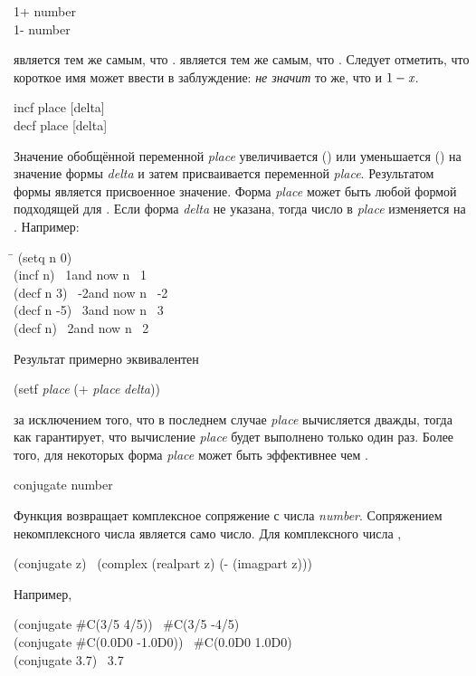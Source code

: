 \begin{defun}[Функция]
1+ number \\
1- number

 является тем же самым, что .
 является тем же самым, что .
Следует отметить, что короткое имя может ввести в заблуждение: 
 \emph{не значит} то же, что и $1-\emph{x}$.
\end{defun}

\begin{defmac}
incf place [delta] \\
decf place [delta]

Значение обобщённой переменной \emph{place} увеличивается () или
уменьшается () на значение формы
\emph{delta} и затем присваивается переменной \emph{place}.
Результатом формы является присвоенное значение.
Форма \emph{place} может быть любой формой подходящей для .
Если форма \emph{delta} не указана, тогда число в \emph{place} изменяется на
.
Например:
\begin{lisp}
\hskip 9pc\=\kill
(setq n 0) \\
(incf n) \EV\ 1\>\textrm{and now} n \EV\ 1 \\
(decf n 3) \EV\ -2\>\textrm{and now} n \EV\ -2 \\
(decf n -5) \EV\ 3\>\textrm{and now} n \EV\ 3 \\
(decf n) \EV\ 2\>\textrm{and now} n \EV\ 2
\end{lisp}
Результат  примерно эквивалентен
\begin{lisp}
(setf \emph{place} (+ \emph{place} \emph{delta}))
\end{lisp}
за исключением того, что в последнем случае \emph{place} вычисляется дважды,
тогда как  гарантирует, что вычисление \emph{place} будет выполнено
только один раз.
Более того, для некоторых форма \emph{place}  может быть
эффективнее чем .
\end{defmac}

\begin{defun}[Функция]
conjugate number

Функция возвращает комплексное сопряжение с числа \emph{number}. 
Сопряжением некомплексного числа является само число. Для комплексного числа
,
\begin{lisp}
(conjugate z) \EQ\ (complex (realpart z) (- (imagpart z)))
\end{lisp}
Например,
\begin{lisp}
(conjugate \#C(3/5 4/5)) \EV\ \#C(3/5 -4/5) \\
(conjugate \#C(0.0D0 -1.0D0)) \EV\ \#C(0.0D0 1.0D0) \\
(conjugate 3.7) \EV\ 3.7
\end{lisp}
\end{defun}

